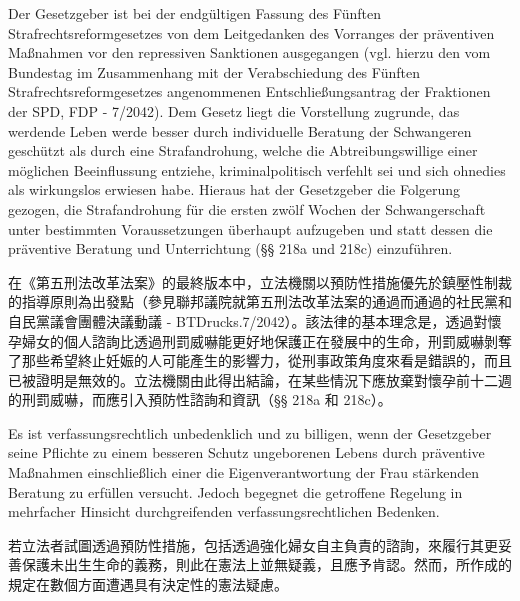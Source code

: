 \documentclass[12pt]{article}
\begin{document}
\syncleft
\begin{sourcepara}
Der Gesetzgeber ist bei der endgültigen Fassung des Fünften Strafrechtsreformgesetzes von dem Leitgedanken des Vorranges der präventiven Maßnahmen vor den repressiven Sanktionen ausgegangen (vgl. hierzu den vom Bundestag im Zusammenhang mit der Verabschiedung des Fünften Strafrechtsreformgesetzes angenommenen Entschließungsantrag der Fraktionen der SPD, FDP - \abbrBTDrucks{} 7/2042). Dem Gesetz liegt die Vorstellung zugrunde, das werdende Leben werde besser durch individuelle Beratung der Schwangeren geschützt als durch eine Strafandrohung, welche die Abtreibungswillige einer möglichen Beeinflussung entziehe, kriminalpolitisch verfehlt sei und sich ohnedies als wirkungslos erwiesen habe. Hieraus hat der Gesetzgeber die Folgerung gezogen, die Strafandrohung für die ersten zwölf Wochen der Schwangerschaft unter bestimmten Voraussetzungen überhaupt aufzugeben und statt dessen die präventive Beratung und Unterrichtung (§§ 218a und 218c) einzuführen.
\end{sourcepara}
\begin{transpara}
在《第五刑法改革法案》的最終版本中，立法機關以預防性措施優先於鎮壓性制裁的指導原則為出發點（參見聯邦議院就第五刑法改革法案的通過而通過的社民黨和自民黨議會團體決議動議 - BTDrucks.7/2042）。該法律的基本理念是，透過對懷孕婦女的個人諮詢比透過刑罰威嚇能更好地保護正在發展中的生命，刑罰威嚇剝奪了那些希望終止妊娠的人可能產生的影響力，從刑事政策角度來看是錯誤的，而且已被證明是無效的。立法機關由此得出結論，在某些情況下應放棄對懷孕前十二週的刑罰威嚇，而應引入預防性諮詢和資訊（§§ 218a 和 218c）。
\end{transpara}

\syncleft
\begin{sourcepara}
Es ist verfassungsrechtlich unbedenklich und zu billigen, wenn der Gesetzgeber seine Pflichte zu einem besseren Schutz ungeborenen Lebens durch präventive Maßnahmen einschließlich einer die Eigenverantwortung der Frau stärkenden Beratung zu erfüllen versucht. Jedoch begegnet die getroffene Regelung in mehrfacher Hinsicht durchgreifenden verfassungsrechtlichen Bedenken.
\end{sourcepara}
\begin{transpara}
若立法者試圖透過預防性措施，包括透過強化婦女自主負責的諮詢，來履行其更妥善保護未出生生命的義務，則此在憲法上並無疑義，且應予肯認。然而，所作成的規定在數個方面遭遇具有決定性的憲法疑慮。
\end{transpara}
\end{document}
